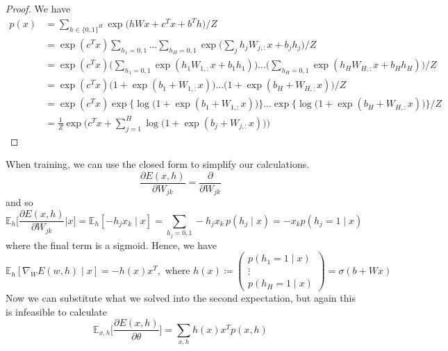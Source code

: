 \documentclass{article}
\begin{document}
    \begin{proof}
      We have 
      \begin{align} 
        p(x) & = \sum_{h \in \{0, 1\}^H} \exp \big( h W x + c^T x + b^T h\big) /Z \\
                      & = \exp (c^T x) \sum_{h_1 = 0, 1} \ldots \sum_{h_H = 0, 1} \exp \bigg( \sum_j h_j W_{j, :} x + b_j h_j \bigg) / Z \\
                      & = \exp (c^T x) \bigg( \sum_{h_1 = 0, 1} \exp (h_1 W_{1, :} x + b_1 h_1 ) \bigg) \ldots \bigg( \sum_{h_H = 0, 1} \exp (h_H W_{H, :} x + b_H h_H) \bigg) / Z \\
                      & = \exp (c^T x) \big( 1 + \exp (b_1 + W_{1, :} x) \big) \ldots \big( 1 + \exp (b_H + W_{H, :} x)\big) / Z \\
                      & = \exp (c^T x) \exp\big\{ \log \big( 1 + \exp (b_1 + W_{1, :} x) \big) \big\} \ldots \exp \big\{ \log \big( 1 + \exp (b_H + W_{H, :} x) \big) \big\} / Z \\
                      & = \frac{1}{Z} \exp \bigg( c^T x + \sum_{j=1}^H \log \big( 1 + \exp (b_j + W_{j, :} x) \big) \bigg) 
      \end{align} 
    \end{proof}

    When training, we can use the closed form to simplify our calculations. 
    \begin{equation}
      \frac{\partial E(x, h)}{\partial W_{j k}} = \frac{\partial}{\partial W_{j k}} 
    \end{equation}
    and so 
    \begin{equation}
      \mathbb{E}_{h} \bigg[ \frac{\partial E(x, h)}{\partial W_{j k}} \bigg| x \bigg] = \mathbb{E}_{h} [ -h_j x_k \mid x] = \sum_{h_j = 0, 1} - h_j x_k \, p(h_j \mid x) = - x_k p(h_j = 1 \mid x)
    \end{equation}
    where the final term is a sigmoid. Hence, we have 
    \begin{equation}
      \mathbb{E}_{h} [ \nabla_{W} E(w, h) \mid x] = - h(x) x^T, \text{ where } h(x) \coloneqq \begin{pmatrix} p(h_1 = 1 \mid x) \\ \vdots \\ p(h_H = 1 \mid x) \end{pmatrix} = \sigma(b + W x)
    \end{equation}
    Now we can substitute what we solved into the second expectation, but again this is infeasible to calculate 
    \begin{equation}
      \mathbb{E}_{x, h} \bigg[ \frac{\partial E(x, h)}{\partial\theta}\bigg] = \sum_{x, h} h(x) x^T p(x, h)
    \end{equation}
\end{document}
